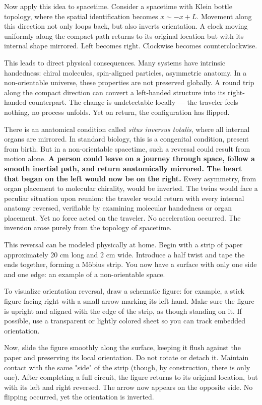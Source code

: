 Now apply this idea to spacetime. Consider a spacetime with Klein bottle topology, where the spatial identification becomes $x \sim -x + L$. Movement along this direction not only loops back, but also inverts orientation. A clock moving uniformly along the compact path returns to its original location but with its internal shape mirrored. Left becomes right. Clockwise becomes counterclockwise.

This leads to direct physical consequences. Many systems have intrinsic handedness: chiral molecules, spin-aligned particles, asymmetric anatomy. In a non-orientable universe, these properties are not preserved globally. A round trip along the compact direction can convert a left-handed structure into its right-handed counterpart. The change is undetectable locally — the traveler feels nothing, no process unfolds. Yet on return, the configuration has flipped.

There is an anatomical condition called \textit{situs inversus totalis}, where all internal organs are mirrored. In standard biology, this is a congenital condition, present from birth. But in a non-orientable spacetime, such a reversal could result from motion alone. \textbf{A person could leave on a journey through space, follow a smooth inertial path, and return anatomically mirrored. The heart that began on the left would now be on the right.} Every asymmetry, from organ placement to molecular chirality, would be inverted. The twins would face a peculiar situation upon reunion: the traveler would return with every internal anatomy reversed, verifiable by examining molecular handedness or organ placement. Yet no force acted on the traveler. No acceleration occurred. The inversion arose purely from the topology of spacetime.

\begin{commentary}
This reversal can be modeled physically at home. Begin with a strip of paper approximately 20 cm long and 2 cm wide. Introduce a half twist and tape the ends together, forming a Möbius strip. You now have a surface with only one side and one edge: an example of a non-orientable space.

To visualize orientation reversal, draw a schematic figure: for example, a stick figure facing right with a small arrow marking its left hand. Make sure the figure is upright and aligned with the edge of the strip, as though standing on it. If possible, use a transparent or lightly colored sheet so you can track embedded orientation.

Now, slide the figure smoothly along the surface, keeping it flush against the paper and preserving its local orientation. Do not rotate or detach it. Maintain contact with the same "side" of the strip (though, by construction, there is only one). After completing a full circuit, the figure returns to its original location, but with its left and right reversed. The arrow now appears on the opposite side. No flipping occurred, yet the orientation is inverted.

\end{commentary}